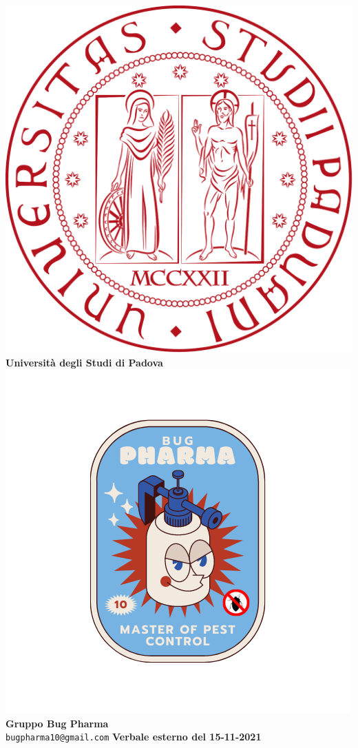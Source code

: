 \documentclass[11pt]{article}
\begin{document}
	\thispagestyle{empty}
	\begin{titlepage}
		\begin{center}
			\includegraphics[scale = 0.05]{../../Res/logo_unipd.png}\\
			\bigskip
			\large \textbf{Università degli Studi di Padova} \\
			\vfill
			\includegraphics[scale = 0.7]{../../Res/BugPharma_Logo.png}\\
			\huge \textbf{Gruppo Bug Pharma} \\
			\vfill
			\large \texttt{bugpharma10@gmail.com}
			\vfill
			\Huge \textbf{Verbale esterno del 15-11-2021}\\
			

\end{center}
\end{titlepage}
\end{document}
